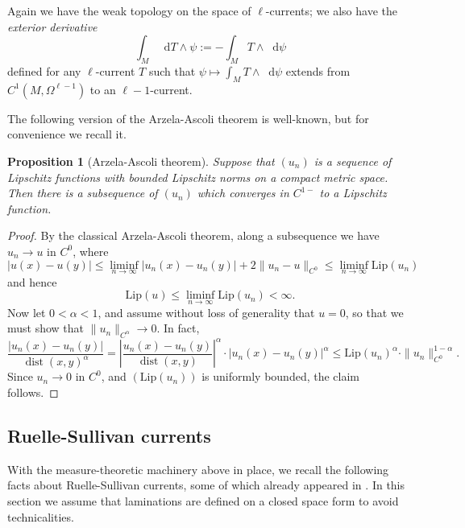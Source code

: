 \documentclass[reqno,11pt]{amsart}
\newcommand*\dif{\mathop{}\!\mathrm{d}}
\DeclareMathOperator{\dist}{dist}
\newcommand{\Lip}{\mathrm{Lip}}
\newcommand{\dfn}[1]{\emph{#1}\index{#1}}
\newtheorem{proposition}[theorem]{Proposition}
\theoremstyle{definition}
\numberwithin{equation}{section}
\begin{document}
Again we have the weak topology on the space of $\ell$-currents; we also have the \dfn{exterior derivative}
$$\int_M \dif T \wedge \psi := -\int_M T \wedge \dif \psi$$
defined for any $\ell$-current $T$ such that $\psi \mapsto \int_M T \wedge \dif \psi$ extends from $C^1(M, \Omega^{\ell - 1})$ to an $\ell - 1$-current.

The following version of the Arzela-Ascoli theorem is well-known, but for convenience we recall it.

\begin{proposition}[Arzela-Ascoli theorem]\label{AA Holder}
Suppose that $(u_n)$ is a sequence of Lipschitz functions with bounded Lipschitz norms on a compact metric space. Then there is a subsequence of $(u_n)$ which converges in $C^{1-}$ to a Lipschitz function.
\end{proposition}
\begin{proof}
By the classical Arzela-Ascoli theorem, along a subsequence we have $u_n \to u$ in $C^0$, where
$$|u(x) - u(y)| \leq \liminf_{n \to \infty} |u_n(x) - u_n(y)| + 2 \|u_n - u\|_{C^0} \leq \liminf_{n \to \infty} \Lip(u_n)$$
and hence
$$\Lip(u) \leq \liminf_{n \to \infty} \Lip(u_n) < \infty.$$
Now let $0 < \alpha < 1$, and assume without loss of generality that $u = 0$, so that we must show that $\|u_n\|_{C^\alpha} \to 0$.
In fact,
$$\frac{|u_n(x) - u_n(y)|}{\dist(x, y)^\alpha} = \left|\frac{u_n(x) - u_n(y)}{\dist(x, y)}\right|^\alpha \cdot |u_n(x) - u_n(y)|^\alpha \leq \Lip(u_n)^\alpha \cdot \|u_n\|_{C^0}^{1 - \alpha}.$$
Since $u_n \to 0$ in $C^0$, and $(\Lip(u_n))$ is uniformly bounded, the claim follows.
\end{proof}

\subsection{Ruelle-Sullivan currents}
With the measure-theoretic machinery above in place, we recall the following facts about Ruelle-Sullivan currents, some of which already appeared in \cite[\S8]{daskalopoulos2020transverse}.
In this section we assume that laminations are defined on a closed space form to avoid technicalities.
\end{document}
